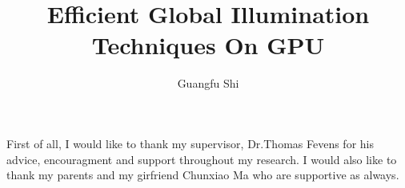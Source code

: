 \documentclass[12pt]{report}
\author{Guangfu Shi}
\title{Efficient Global Illumination Techniques On GPU}
\begin{document}
\begin{abstract}

\end{abstract}

\begin{acknowledgments}
First of all, I would like to thank my supervisor, Dr.Thomas Fevens for his advice, encouragment and support throughout my research. I would also like to thank my parents and my girfriend Chunxiao Ma who are supportive as always.
\end{acknowledgments}


\setcounter{page}{1}

\begin{spacing}{2.0}
	
 







	

		

%				



\end{spacing}
\end{document}
